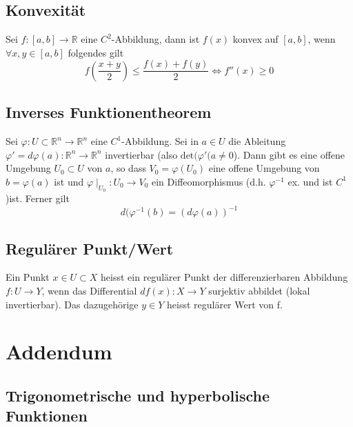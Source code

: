 \documentclass[8pt, a4paper, landscape, fleqn]{scrartcl}
\begin{document}
\begin{multicols*}{3}
			\subsection{Konvexität}
				Sei $f:[a, b] \to \mathbb{R}$ eine $C^2$-Abbildung, dann ist $f(x)$ konvex auf $[a, b]$, wenn $\forall x, y \in [a, b]$ folgendes gilt
				\begin{equation*}
					f\left(\frac{x+y}{2}\right)\le \frac{f(x)+f(y)}{2} \Leftrightarrow f''(x) \ge 0
				\end{equation*}
			\subsection{Inverses Funktionentheorem}
				Sei $\varphi: U \subset \mathbb{R}^n \rightarrow \mathbb{R}^n$ eine
				$C^1$-Abbildung. Sei in $a \in U$ die Ableitung $\varphi'=d\varphi(a): \mathbb{R}^n \to \mathbb{R}^n$ invertierbar (also $\text{det}(\varphi'(a \ne 0$). Dann gibt es eine offene Umgebung $U_0 \subset U$ von $a$, so dass $V_0=\varphi(U_0)$ eine offene Umgebung von $b=\varphi(a)$ ist und $\varphi\mid_{U_0}: U_0 \to V_0$ ein Diffeomorphismus (d.h. $\varphi^{-1}$ ex. und ist $C^1$)ist. Ferner gilt
				\begin{equation*}
					d(\varphi^{-1}(b)=(d\varphi(a))^{-1}
				\end{equation*}
			\subsection{Regulärer Punkt/Wert}
			    Ein Punkt $x \in U \subset X$ heisst ein regulärer Punkt der differenzierbaren Abbildung $f: U \to Y$, wenn das Differential $df(x): X \to Y$ surjektiv abbildet (lokal invertierbar). Das dazugehörige $y \in Y$ heisst regulärer Wert von f.
		\section{Addendum}
			\renewcommand{\arraystretch}{1.3} %
			\setlength{\tabcolsep}{5pt}
			\subsection{Trigonometrische und hyperbolische Funktionen}

\end{multicols*}
\end{document}
